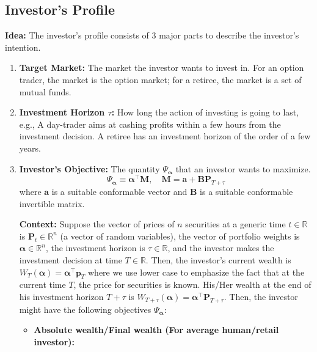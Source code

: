 \documentclass[13pt]{article}
\theoremstyle{definition}
\theoremstyle{remark}
\begin{document}
\subsection{Investor's Profile}
{\color{C6}\textbf{Idea:} The investor's profile consists of $3$ major parts to describe the investor's intention.}
\begin{enumerate}
\item \textbf{Target Market:} The market the investor wants to invest in. For an option trader, the market is the option market; for a retiree, the market is a set of mutual funds.
\item \textbf{Investment Horizon $\tau$:} How long the action of investing is going to last, e.g., A day-trader aims at cashing profits within a few hours from the investment decision. A retiree has an investment horizon of the order of a few years.
\item \textbf{Investor's Objective:} The quantity $\Psi_{\bm{\alpha}}$ that an investor wants to maximize.
\[
\Psi_{\bm{\alpha}} \equiv \bm{\alpha}^{\top}\mathbf{M}, \quad \mathbf{M} = \bm{a} +\mathbf{B}\mathbf{P}_{T+\tau}
\]
where $\bm{a}$ is a suitable conformable vector and $\mathbf{B}$ is a suitable conformable invertible matrix.

    \textbf{Context:} Suppose the vector of prices of $n$ securities at a generic time $t\in\mathbb{R}$ is $\mathbf{P}_{t}\in\mathbb{R}^{n}$ (a vector of random variables), the vector of portfolio weights is $\bm{\alpha}\in\mathbb{R}^{n}$, the investment horizon is $\tau\in\mathbb{R}$, and the investor makes the investment decision at time $T\in\mathbb{R}$. Then, the investor's current wealth is $W_T(\bm{\alpha})=\bm{\alpha}^\top \mathbf{p}_T$ where we use lower case to emphasize the fact that at the current time $T$, the price for securities is known. His/Her wealth at the end of his investment horizon $T+\tau$ is $W_{T+\tau}(\bm{\alpha})=\bm{\alpha}^\top \mathbf{P}_{T+\tau}$. Then, the investor might have the following objectives $\Psi_{\bm{\alpha}}$:
    \begin{itemize}
        \item \textbf{Absolute wealth/Final wealth (For average human/retail investor):}
        

\end{itemize}
\end{enumerate}
\end{document}
